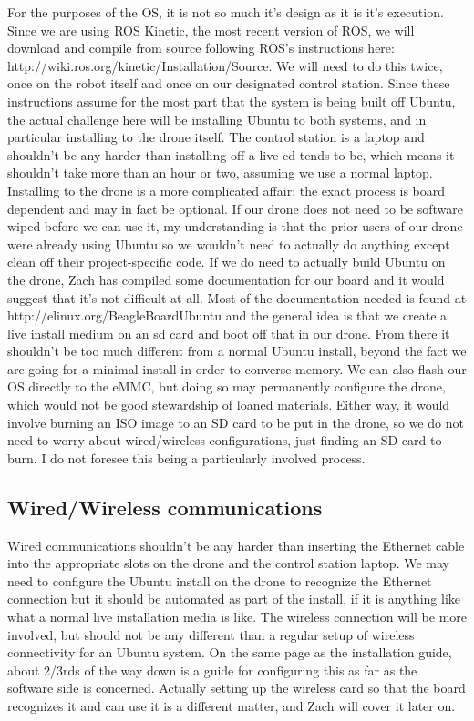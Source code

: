 \documentclass[IEEEtran,letterpaper,10pt,titlepage,draftclsnofoot,onecolumn]{article}
\begin{document}
For the purposes of the OS, it is not so much it's design as it is it's execution. 
Since we are using ROS Kinetic, the most recent version of ROS, we will download and compile from source following ROS's instructions here: http://wiki.ros.org/kinetic/Installation/Source. 
We will need to do this twice, once on the robot itself and once on our designated control station. 
Since these instructions assume for the most part that the system is being built off Ubuntu, the actual challenge here will be installing Ubuntu to both systems, and in particular installing to the drone itself. 
The control station is a laptop and shouldn't be any harder than installing off a live cd tends to be, which means it shouldn't take more than an hour or two, assuming we use a normal laptop. 
Installing to the drone is a more complicated affair; the exact process is board dependent and may in fact be optional. 
If our drone does not need to be software wiped before we can use it, my understanding is that the prior users of our drone were already using Ubuntu so we wouldn't need to actually do anything except clean off their project-specific code. 
If we do need to actually build Ubuntu on the drone, Zach has compiled some documentation for our board and it 
would suggest that it's not difficult at all. 
Most of the documentation needed is found at http://elinux.org/BeagleBoardUbuntu and the general idea is that we create a live install medium on an sd card and boot off that in our drone. 
From there it shouldn't be too much different from a normal 
Ubuntu install, beyond the fact we are going for a minimal install in order to converse memory. 
We can also flash our OS directly to the eMMC, but doing so may permanently configure the drone, which 
would not be good stewardship of loaned materials. 
Either way, it would involve burning an ISO image to an SD card to be put in the drone, so we do not need to worry about wired/wireless configurations, just finding an SD card to burn. I do not foresee this being a particularly involved process.

\subsection*{Wired/Wireless communications}

Wired communications shouldn't be any harder than inserting the Ethernet cable into the appropriate slots on the drone and the control station laptop. 
We may need to configure the Ubuntu install on the drone to recognize the Ethernet connection but it should be automated as part of the install, if it is anything like what a normal live installation media is like. 
The wireless connection will be more involved, but should not be any different than a regular setup of wireless connectivity for an Ubuntu system. 
On the same page as the installation guide, about 2/3rds of the way down is a guide for configuring this as far as the software side is concerned. 
Actually setting up the wireless card so that the board recognizes it and can use it is a different matter, and Zach will cover it later on.
\end{document}
